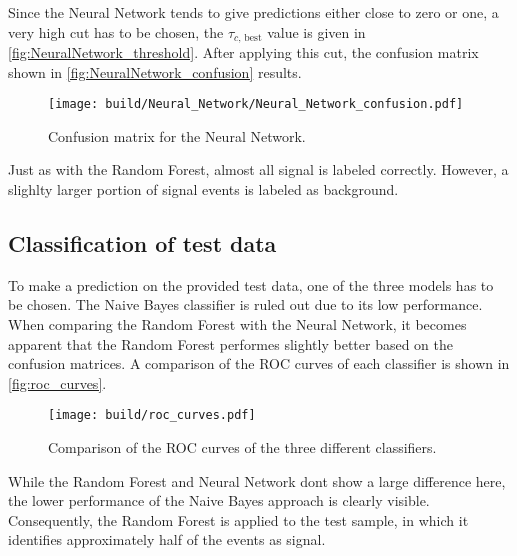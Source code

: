 Since the Neural Network tends to give predictions either close to zero or one,
a very high cut has to be chosen, the $\tau_{c \text{, best}}$ value is given in
\autoref{fig:NeuralNetwork_threshold}.
After applying this cut, the confusion matrix shown in \autoref{fig:NeuralNetwork_confusion}
results.

\begin{figure}[H]
  \centering
  \texttt{[image: build/Neural\_Network/Neural\_Network\_confusion.pdf]}
  \caption{Confusion matrix for the Neural Network.}
  \label{fig:NeuralNetwork_confusion}
\end{figure}

Just as with the Random Forest, almost all signal is labeled correctly.
However, a slighlty larger portion of signal events is labeled as background.

\subsection{Classification of test data}

To make a prediction on the provided test data, one of the three models has
to be chosen. The Naive Bayes classifier is ruled out due to its low performance.
When comparing the Random Forest with the Neural Network, it becomes apparent that
the Random Forest performes slightly better based on the confusion matrices.
A comparison of the ROC curves of each classifier is shown in \autoref{fig:roc_curves}.

\begin{figure}[H]
  \centering
  \texttt{[image: build/roc\_curves.pdf]}
  \caption{Comparison of the ROC curves of the three different classifiers.}
  \label{fig:roc_curves}
\end{figure}

While the Random Forest and Neural Network dont show a large difference here, the
lower performance of the Naive Bayes approach is clearly visible.
Consequently, the Random Forest is applied to the test sample, in which it
identifies approximately half of the events as signal.